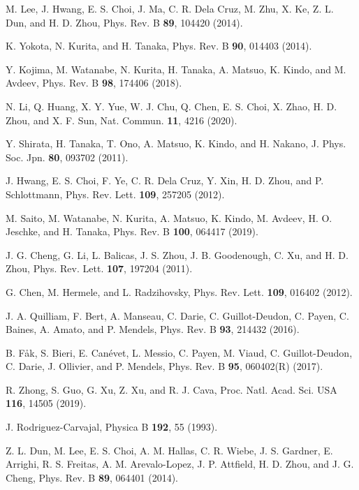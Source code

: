 \documentclass[aps,twocolumn,superscriptaddress,showpacs]{revtex4-1}
\begin{document}
\begin{thebibliography}{}
M. Lee, J. Hwang, E. S. Choi, J. Ma, C. R. Dela Cruz, M. Zhu, X. Ke, Z. L. Dun, and H. D. Zhou, Phys. Rev. B {\bf 89}, 104420 (2014).

K. Yokota, N. Kurita, and H. Tanaka, Phys. Rev. B {\bf 90}, 014403 (2014).

Y. Kojima, M. Watanabe, N. Kurita, H. Tanaka, A. Matsuo, K. Kindo, and M. Avdeev, Phys. Rev. B {\bf 98}, 174406 (2018).

N. Li, Q. Huang, X. Y. Yue, W. J. Chu, Q. Chen, E. S. Choi, X. Zhao, H. D. Zhou, and X. F. Sun, Nat. Commun. {\bf 11}, 4216 (2020).

Y. Shirata, H. Tanaka, T. Ono, A. Matsuo, K. Kindo, and H. Nakano, J. Phys. Soc. Jpn.
{\bf 80}, 093702 (2011).

J. Hwang, E. S. Choi, F. Ye, C. R. Dela Cruz, Y. Xin, H. D. Zhou, and P. Schlottmann, Phys. Rev. Lett. {\bf 109}, 257205 (2012).

M. Saito, M. Watanabe, N. Kurita, A. Matsuo, K. Kindo, M. Avdeev, H. O. Jeschke, and H. Tanaka, Phys. Rev. B {\bf 100}, 064417 (2019).

J. G. Cheng, G. Li, L. Balicas, J. S. Zhou, J. B. Goodenough, C. Xu, and H. D. Zhou, Phys. Rev. Lett. {\bf 107}, 197204 (2011).

G. Chen, M. Hermele, and L. Radzihovsky, Phys. Rev. Lett. {\bf 109}, 016402 (2012).

J. A. Quilliam, F. Bert, A. Manseau, C. Darie, C. Guillot-Deudon, C. Payen, C. Baines, A. Amato, and P. Mendels, Phys. Rev. B {\bf 93}, 214432 (2016).

B. F\aa{}k, S. Bieri, E. Can\'evet, L. Messio, C. Payen, M. Viaud, C. Guillot-Deudon, C. Darie, J. Ollivier, and P. Mendels, Phys. Rev. B {\bf 95}, 060402(R) (2017).

R. Zhong, S. Guo, G. Xu, Z. Xu, and R. J. Cava, Proc. Natl. Acad. Sci. USA {\bf 116}, 14505 (2019).

J. Rodriguez-Carvajal, Physica B {\bf 192}, 55 (1993).

Z. L. Dun, M. Lee, E. S. Choi, A. M. Hallas, C. R. Wiebe, J. S. Gardner, E. Arrighi, R. S. Freitas, A. M. Arevalo-Lopez, J. P. Attfield, H. D. Zhou, and J. G. Cheng, Phys. Rev. B {\bf 89}, 064401 (2014).


\end{thebibliography}
\end{document}

